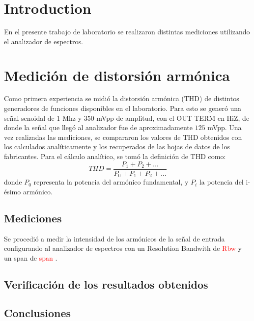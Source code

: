 \section{Introduction}

En el presente trabajo de laboratorio se realizaron distintas mediciones utilizando el analizador de espectros.

\section{Medición de distorsión armónica}
Como primera experiencia se midió la distorsión armónica (THD) de distintos generadores de funciones disponibles en el laboratorio. Para esto se generó una señal senoidal de $1$ Mhz y $350$ mVpp de amplitud, con el OUT TERM en HiZ, de donde la señal que llegó al analizador fue de aproximadamente $125$ mVpp. Una vez realizadas las mediciones, se compararon los valores de THD obtenidos con los calculados analíticamente y los recuperados de las hojas de datos de los fabricantes. Para el cálculo analítico, se tomó la definición de THD como:
\begin{equation}
    THD=\frac{P_1+P_2+...}{P_0+P_1+P_2+...}
    \label{eq:THD}
\end{equation}
donde $P_0$ representa la potencia del armónico fundamental, y $P_i$ la potencia del i-ésimo armónico.

\subsection{Mediciones}
Se procedió a medir la intensidad de los armónicos de la señal de entrada configurando al analizador de espectros con un Resolution Bandwith de \textcolor{red}{Rbw} y un span de \textcolor{red}{span} .

\subsection{Verificación de los resultados obtenidos}

\subsection{Conclusiones}

